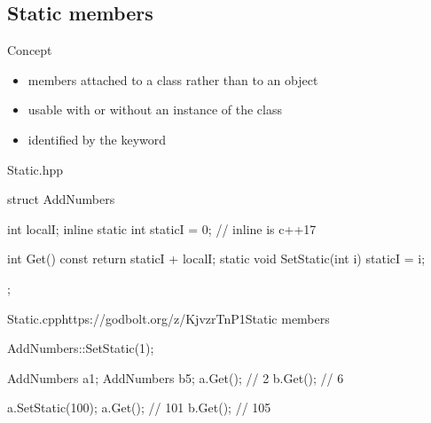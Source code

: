 \subsection[static]{Static members}

\begin{frame}[fragile]
  \begin{block}{Concept}
    \begin{itemize}
    \item members attached to a class rather than to an object
    \item usable with or without an instance of the class
    \item identified by the  keyword
    \end{itemize}
  \end{block}

  \vspace{-1\baselineskip}
  \begin{overprint}
  \begin{exampleblock}{Static.hpp}
  \begin{cppcode}
    struct AddNumbers {
        int localI;
        inline static int staticI = 0; // inline is c++17

        int Get() const { return staticI + localI; }
        static void SetStatic(int i) { staticI = i; }
    };
  \end{cppcode}
  \end{exampleblock}

  \begin{exampleblockGB}{Static.cpp}{https://godbolt.org/z/KjvzrTnP1}{Static members}
  \begin{cppcode}
    AddNumbers::SetStatic(1);

    AddNumbers a{1}; AddNumbers b{5};
    a.Get(); // 2
    b.Get(); // 6

    a.SetStatic(100);
    a.Get(); // 101
    b.Get(); // 105
  \end{cppcode}
  \end{exampleblockGB}
  \end{overprint}
\end{frame}
